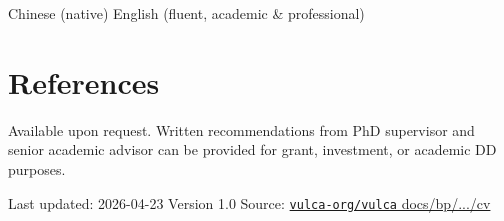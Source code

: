 \documentclass[10.5pt,a4paper]{article}
\begin{document}
Chinese (native) \textperiodcentered{} English (fluent, academic \& professional)

\section*{References}

Available upon request. Written recommendations from PhD supervisor and senior academic
advisor can be provided for grant, investment, or academic DD purposes.

\vspace{1cm}

\begin{center}
{\color{muted}\footnotesize
Last updated: 2026-04-23 \textperiodcentered{} Version 1.0 \textperiodcentered{} Source:
\href{https://github.com/vulca-org/vulca/tree/master/docs/bp/2026-04-23-vulca-bp/cv}{\texttt{vulca-org/vulca} \textperiodcentered{} docs/bp/.../cv}}
\end{center}
\end{document}
